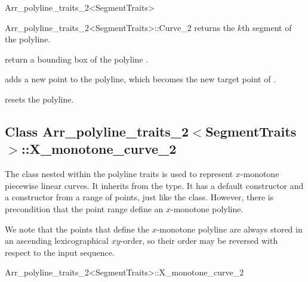 \begin{ccRefClass}{Arr_polyline_traits_2<SegmentTraits>}
\begin{ccClass}{Arr_polyline_traits_2<SegmentTraits>::Curve_2}
  {returns the $k$th segment of the polyline.
   }

  {return a bounding box of the polyline \ccVar{}.}

\ccOperations

  {adds a new point to the polyline, which becomes the new target point
   of \ccVar{}.}

  {resets the polyline.}

\end{ccClass}

\subsection*{Class 
  Arr\_polyline\_traits\_2$<$SegmentTraits$>$::X\_monotone\_curve\_2}

The  class nested within the polyline traits is used
to represent $x$-monotone piecewise linear curves. It inherits from the
 type. It has a default constructor and a constructor from a
range of points, just like the  class. However, there is
precondition that the point range define an $x$-monotone polyline.

We note that the points that define the $x$-monotone polyline are
always stored in an ascending lexicographical $xy$-order, so their order may
be reversed with respect to the input sequence.

\begin{ccClass}{Arr_polyline_traits_2<SegmentTraits>::X_monotone_curve_2}
\end{ccClass}

\end{ccRefClass}
\ccRefPageEnd
